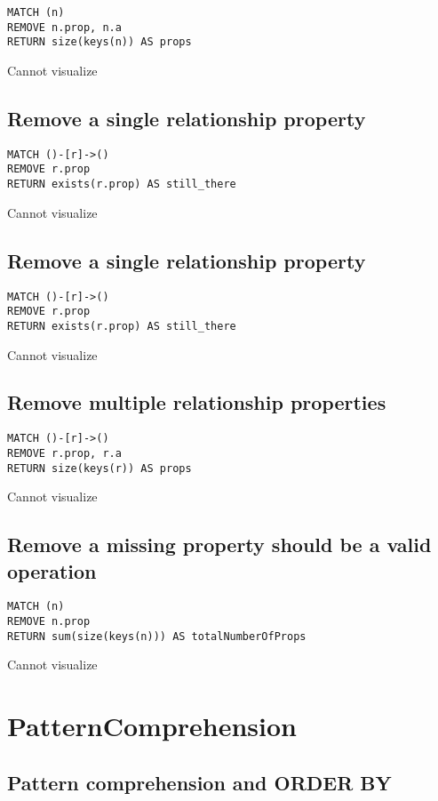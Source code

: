 \begin{lstlisting}
MATCH (n)
REMOVE n.prop, n.a
RETURN size(keys(n)) AS props
\end{lstlisting}

Cannot visualize
\subsection{Remove a single relationship property}

\begin{lstlisting}
MATCH ()-[r]->()
REMOVE r.prop
RETURN exists(r.prop) AS still_there
\end{lstlisting}

Cannot visualize
\subsection{Remove a single relationship property}

\begin{lstlisting}
MATCH ()-[r]->()
REMOVE r.prop
RETURN exists(r.prop) AS still_there
\end{lstlisting}

Cannot visualize
\subsection{Remove multiple relationship properties}

\begin{lstlisting}
MATCH ()-[r]->()
REMOVE r.prop, r.a
RETURN size(keys(r)) AS props
\end{lstlisting}

Cannot visualize
\subsection{Remove a missing property should be a valid operation}

\begin{lstlisting}
MATCH (n)
REMOVE n.prop
RETURN sum(size(keys(n))) AS totalNumberOfProps
\end{lstlisting}

Cannot visualize
\section{PatternComprehension}

\subsection{Pattern comprehension and ORDER BY}

